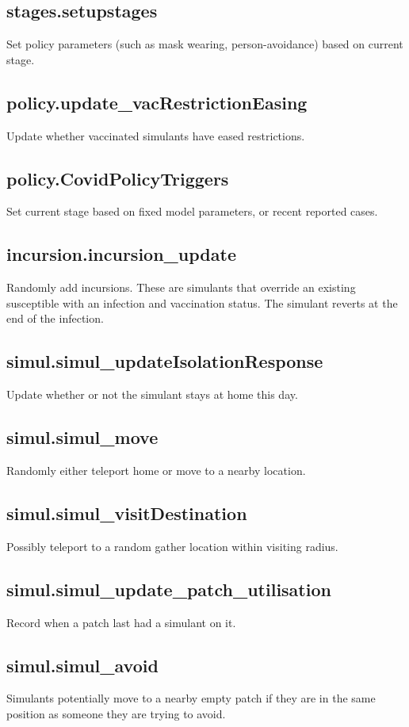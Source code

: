 \documentclass[]{article}
\begin{document}
\subsection{stages.setupstages}
Set policy parameters (such as mask wearing, person-avoidance) based on current stage.

\subsection{policy.update\_vacRestrictionEasing}
Update whether vaccinated simulants have eased restrictions.

\subsection{policy.CovidPolicyTriggers}
Set current stage based on fixed model parameters, or recent reported cases.

\subsection{incursion.incursion\_update}
Randomly add incursions. These are simulants that override an existing susceptible with an infection and vaccination status. The simulant reverts at the end of the infection.

\subsection{simul.simul\_updateIsolationResponse}
Update whether or not the simulant stays at home this day.

\subsection{simul.simul\_move}
Randomly either teleport home or move to a nearby location.

\subsection{simul.simul\_visitDestination}
Possibly teleport to a random gather location within visiting radius.

\subsection{simul.simul\_update\_patch\_utilisation}
Record when a patch last had a simulant on it.

\subsection{simul.simul\_avoid}
Simulants potentially move to a nearby empty patch if they are in the same position as someone they are trying to avoid.
\end{document}
